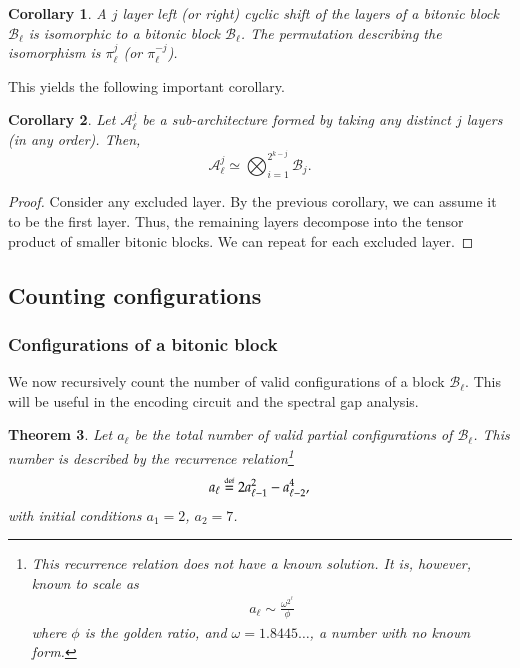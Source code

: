 \documentclass[11pt,letterpaper]{article}
\newtheorem{theorem}{Theorem}[section]
\newtheorem{corollary}[theorem]{Corollary}
\theoremstyle{definition}
\theoremstyle{remark}
\newcommand{\defeq}{\stackrel{\mbox{\normalfont\tiny def}}=}
\newcommand{\cA}{\mathcal A}
\newcommand{\cB}{\mathcal B}
\numberwithin{equation}{section}
\theoremstyle{definition}
\begin{document}
\begin{corollary}
A $j$ layer left (or right) cyclic shift of the layers of a bitonic block $\cB_\ell$ is isomorphic to a bitonic block $\cB_\ell$. The permutation describing the isomorphism is $\pi_\ell^j$ (or $\pi_\ell^{-j}$).
\end{corollary}

%

This yields the following important corollary.

\begin{corollary}
Let $\cA_\ell^j$ be a sub-architecture formed by taking any distinct $j$ layers (in any order). Then,
\begin{equation}
\cA_\ell^j \simeq \bigotimes_{i = 1}^{2^{k-j}} \cB_j.
\end{equation}
\label{cor:subbitonic}
\end{corollary}

\begin{proof}
Consider any excluded layer. By the previous corollary, we can assume it to be the first layer. Thus, the remaining layers decompose into the tensor product of smaller bitonic blocks. We can repeat for each excluded layer.
\end{proof}

%
%
%
%
%
%

%

%
%
%
%
%
%
%
%
%

\subsection{Counting configurations}

\subsubsection{Configurations of a bitonic block}\label{sec:countingBitonicBlock}

We now recursively count the number of valid configurations of a block $\cB_\ell$. This will be useful in the encoding circuit and the spectral gap analysis.

%

\begin{theorem}\label{thm:countingBitonicBlock}
  Let $a_\ell$ be the total number of valid partial configurations of $\mathcal{B}_\ell$. This number is described by the recurrence relation\footnote{This recurrence relation does not have a known solution. It is, however, known to scale as
\begin{eqnarray}
  a_\ell \sim \frac{\omega^{2^\ell}}{\phi}
\end{eqnarray}
where $\phi$ is the golden ratio, and $\omega=1.8445\ldots$, a number with no known form.}
  \begin{eqnarray}
    a_\ell \defeq 2a_{\ell-1}^2-a_{\ell-2}^4,
  \end{eqnarray}
  with initial conditions $a_1=2$, $a_2=7$.
\label{thm:numbconfigs}
\end{theorem}
\end{document}
